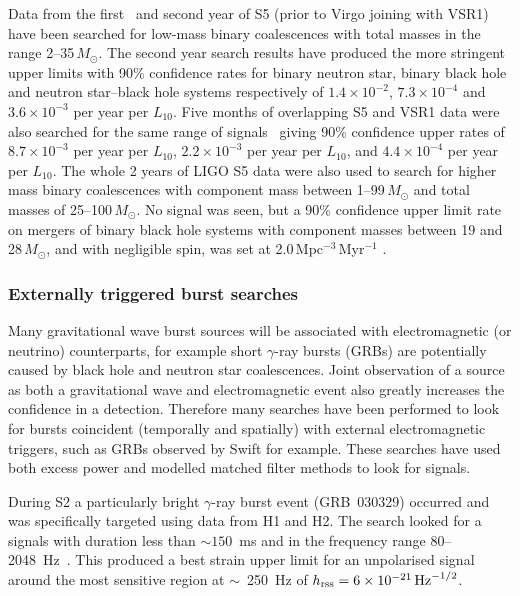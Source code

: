 \documentclass{article}
\begin{document}
Data from the first~\cite{Abbott:2009e} and second year of S5 (prior to Virgo
joining with VSR1)~\cite{Abbott:2009f} have been searched for low-mass binary
coalescences with total masses in the range 2--35\,$M_{\odot}$. The second
year search results have produced the more stringent upper limits with 90\%
confidence rates for binary neutron star, binary black hole and neutron
star--black hole systems respectively of $1.4\times10^{-2}$, $7.3\times10^{-4}$
and $3.6\times10^{-3}$ per year per $L_{10}$. Five months of overlapping S5 and
VSR1 data were also searched for the same range of signals~\cite{Abadie:2010f}
giving 90\% confidence upper rates of $8.7\times10^{-3}$ per year per $L_{10}$,
$2.2\times10^{-3}$ per year per $L_{10}$, and $4.4\times10^{-4}$ per year per
$L_{10}$. The whole 2 years of LIGO S5 data were also used to search for higher
mass binary coalescences with component mass between 1--99\,$M_{\odot}$ and
total masses of 25--100\,$M_{\odot}$. No signal was seen, but a 90\%
confidence upper limit rate on mergers of binary black hole systems with
component masses between 19 and 28\,$M_{\odot}$, and with negligible spin, was
set at 2.0\,Mpc$^{-3}$\,Myr$^{-1}$ \cite{Abadie:2011a}. 

\subsubsection{Externally triggered burst searches}

Many gravitational wave burst sources will be associated with electromagnetic
(or neutrino) counterparts, for example short $\gamma$-ray bursts (GRBs) are
potentially caused by black hole and neutron star coalescences. Joint
observation of a source as both a gravitational wave and electromagnetic
event also greatly increases the confidence in a detection. Therefore many
searches have been performed to look for bursts coincident (temporally and
spatially) with external electromagnetic triggers, such as GRBs observed by
Swift for example. These searches have used both excess power and modelled
matched filter methods to look for signals.

During S2 a particularly bright $\gamma$-ray burst event (GRB~030329) occurred
and was specifically targeted using data from H1 and H2. The search looked for
a signals with duration less than $\sim 150$~ms and in the frequency range
80--2048~Hz~\cite{Abbott:2005d}. This produced a best strain upper limit for an
unpolarised signal around the most sensitive region at  $\sim$~250~Hz of $h_{\rm
rss}=6\times10^{-21}\,{\rm Hz}^{-1/2}$.
\end{document}
